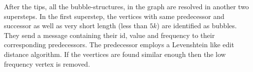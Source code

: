 \documentclass[conference]{IEEEtran}
\begin{document}
After the tips, all the bubble-structures, in the graph are resolved in another two supersteps.
In the first superstep, the vertices with same predecessor and successor as well as very short length (less than $5k$) are identified as bubbles. They send a message containing their id, value and frequency to their corresponding predecessors. 
The predecessor employs a Levenshtein like edit distance algorithm. If the veertices are found similar enough then the low frequency vertex is removed. 

 

\end{document}
